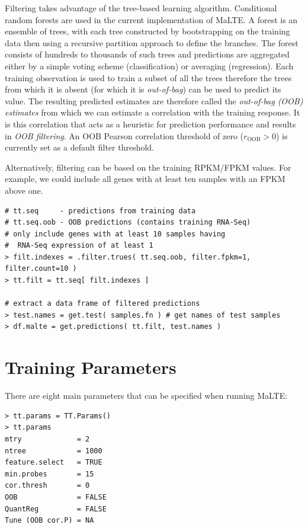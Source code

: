 \documentclass[a4paper,12pt]{article}
\begin{document}
Filtering takes advantage of the tree-based learning algorithm. Conditional random forests are used in the current implementation of \textsf{MaLTE}. A forest is an ensemble of trees, with each tree constructed by bootstrapping on the training data then using a recursive partition approach to define the branches. The forest consists of hundreds to thousands of such trees and predictions are aggregated either by a simple voting scheme (classification) or averaging (regression). Each training observation is used to train a subset of all the trees therefore the trees from which it is absent (for which it is \textit{out-of-bag}) can be used to predict its value. The resulting predicted estimates are therefore called the \textit{out-of-bag (OOB) estimates} from which we can estimate a correlation with the training response. It is this correlation that acts as a heuristic for prediction performance and results in \textit{OOB filtering}. An OOB Pearson correlation threshold of zero ($r_{\mathrm{OOB}} > 0$) is currently set as a default filter threshold.

Alternatively, filtering can be based on the training RPKM/FPKM values. For example, we could include all genes with at least ten samples with an FPKM above one.

\begin{verbatim}
# tt.seq     - predictions from training data 
# tt.seq.oob - OOB predictions (contains training RNA-Seq)
# only include genes with at least 10 samples having
#  RNA-Seq expression of at least 1
> filt.indexes = .filter.trues( tt.seq.oob, filter.fpkm=1, filter.count=10 )
> tt.filt = tt.seq[ filt.indexes ]

# extract a data frame of filtered predictions
> test.names = get.test( samples.fn ) # get names of test samples
> df.malte = get.predictions( tt.filt, test.names )
\end{verbatim}

\section{Training Parameters}
\label{params}

There are eight main parameters that can be specified when running \textsf{MaLTE:}

\begin{verbatim}
> tt.params = TT.Params()
> tt.params
mtry             = 2 
ntree            = 1000 
feature.select   = TRUE 
min.probes       = 15 
cor.thresh       = 0 
OOB              = FALSE 
QuantReg         = FALSE 
Tune (OOB cor.P) = NA
\end{verbatim} 
\end{document}

